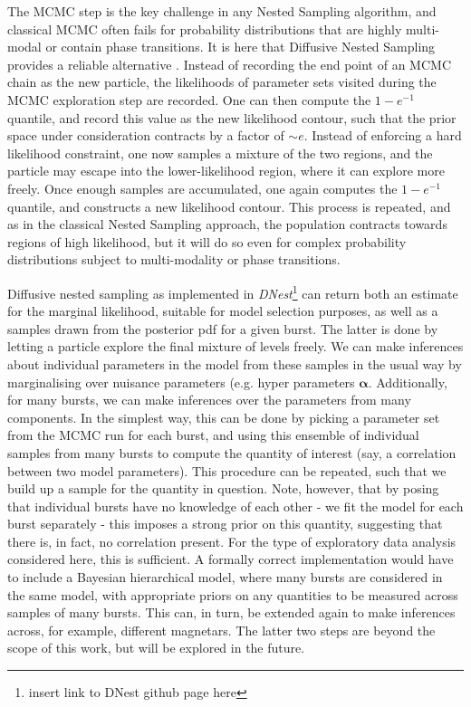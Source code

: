 \documentclass[12pt]{emulateapj}
\begin{document}
The MCMC step is the key challenge in any Nested Sampling algorithm, and classical MCMC often fails for probability distributions that
are highly multi-modal or contain phase transitions. It is here that Diffusive Nested Sampling provides a reliable alternative \citep[for details, see][]{brewer2011}. 
Instead of recording the end point of an MCMC chain as the new particle, the likelihoods of parameter sets visited during the MCMC exploration step
 are recorded. One can then compute the $1-e^{-1}$ quantile, and record this value as the new likelihood contour, such that the prior space
 under consideration contracts by a factor of $\sim e$. Instead of enforcing a hard likelihood constraint, one now samples a mixture of the 
 two regions, and the particle may escape into the lower-likelihood region, where it can explore more freely. Once enough samples are accumulated,
 one again computes the $1-e^{-1}$ quantile, and constructs a new likelihood contour. This process is repeated, and as in the classical Nested Sampling
 approach, the population contracts towards regions of high likelihood, but it will do so even for complex probability distributions subject to multi-modality
 or phase transitions.

Diffusive nested sampling as implemented in {\it DNest}\footnote{insert link to DNest github page here} can return both an estimate for the marginal likelihood,
suitable for model selection purposes, as well as a samples drawn from the posterior pdf for a given burst. The latter is done by letting a particle explore
the final mixture of levels freely. 
We can make inferences about individual parameters in the model from these samples in the usual way by marginalising over nuisance parameters (e.g. 
hyper parameters $\bm{\alpha}$. Additionally, for many bursts, we can make inferences over the parameters from many components. In the simplest way,
this can be done by picking a parameter set from the MCMC run for each burst, and using this ensemble of individual samples from many bursts 
to compute the quantity of interest (say, a correlation between two model parameters). This procedure can be repeated, such that we build up a sample
for the quantity in question. Note, however, that by posing that individual bursts have no knowledge of each other - we fit the model for each burst separately - 
this imposes a strong prior on this quantity, suggesting that there is, in fact, no correlation present. 
For the type of exploratory data analysis considered here, this is sufficient. A formally correct implementation would have to include a Bayesian hierarchical model,
where many bursts are considered in the same model, with appropriate priors on any quantities to be measured across samples of many bursts. This can, in turn,
be extended again to make inferences across, for example, different magnetars. The latter two steps are beyond the scope of this work, but will be explored in the future.
\end{document}
